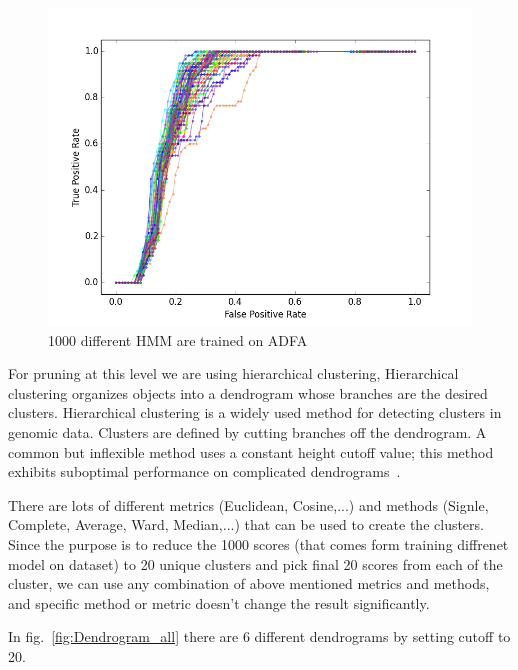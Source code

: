 \begin{figure}[H]
\centering
\includegraphics[width=1\linewidth]{figs/1000-ADFA}
\caption{1000 different HMM are trained on ADFA}
\label{fig::1000_ADFA}
\end{figure}

For pruning at this level we are using hierarchical clustering,  Hierarchical clustering organizes objects into a dendrogram whose branches are the desired clusters. Hierarchical clustering is a widely used method for detecting clusters in genomic data. Clusters are defined by cutting branches off the dendrogram. A common but inflexible method uses a constant height cutoff value; this method exhibits suboptimal performance on complicated dendrograms~\cite{Langfelder2008}.   

There are lots of different metrics (Euclidean, Cosine,...) and methods (Signle, Complete, Average, Ward, Median,...) that can be used to create the clusters. Since the purpose is to reduce the 1000 scores (that comes form training diffrenet model on dataset) to 20 unique clusters and pick final 20 scores from each of the cluster, we can use any combination of above mentioned metrics and methods, and specific method or metric doesn't change the result significantly.

In fig.~\ref{fig:Dendrogram_all} there are 6 different dendrograms by setting cutoff to 20.


